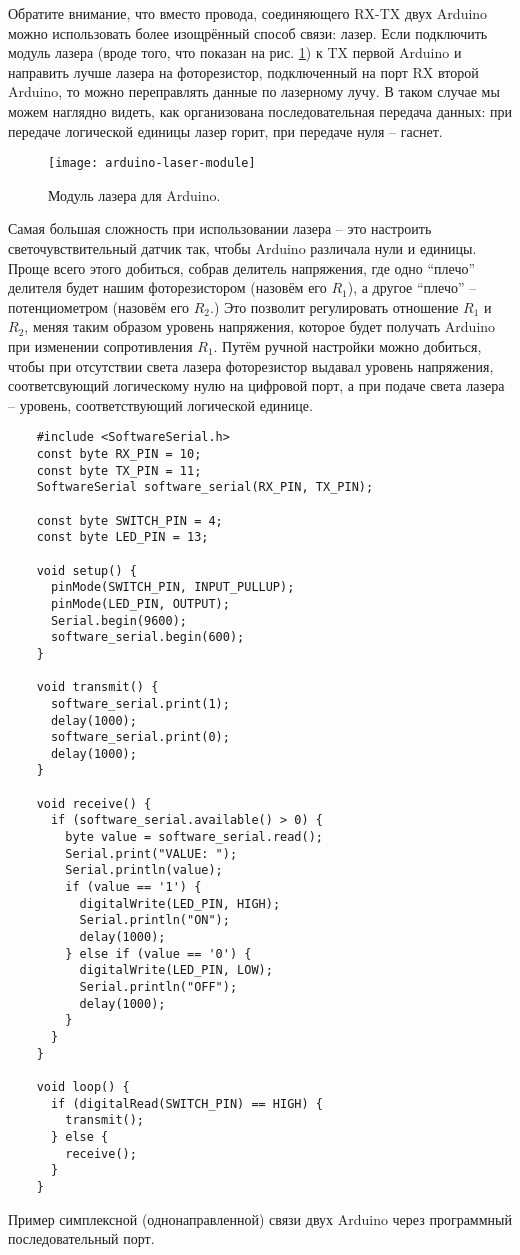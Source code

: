 \documentclass[../sparc.tex]{subfiles}
\begin{document}
Обратите внимание, что вместо провода, соединяющего RX-TX двух Arduino можно
использовать более изощрённый способ связи: лазер.  Если подключить модуль
лазера (вроде того, что показан на рис. \ref{fig:arduino-laser-module}) к TX
первой Arduino и направить лучше лазера на фоторезистор, подключенный на порт RX
второй Arduino, то можно переправлять данные по лазерному лучу.  В таком случае
мы можем наглядно видеть, как организована последовательная передача данных: при
передаче логической единицы лазер горит, при передаче нуля -- гаснет.

\begin{figure}[ht]
  \centering
  \texttt{[image: arduino-laser-module]}
  \caption{Модуль лазера для Arduino.}
  \label{fig:arduino-laser-module}
\end{figure}


Самая большая сложность при использовании лазера -- это настроить
светочувствительный датчик так, чтобы Arduino различала нули и единицы.  Проще
всего этого добиться, собрав делитель напряжения, где одно ``плечо'' делителя
будет нашим фоторезистором (назовём его $R_1$), а другое ``плечо'' --
потенциометром (назовём его $R_2$.)  Это позволит регулировать отношение $R_1$ и
$R_2$, меняя таким образом уровень напряжения, которое будет получать Arduino
при изменении сопротивления $R_1$.  Путём ручной настройки можно добиться, чтобы
при отсутствии света лазера фоторезистор выдавал уровень напряжения,
соответсвующий логическому нулю на цифровой порт, а при подаче света лазера --
уровень, соответствующий логической единице.

\begin{listing}[H]
  \begin{verbatim}
    #include <SoftwareSerial.h>
    const byte RX_PIN = 10;
    const byte TX_PIN = 11;
    SoftwareSerial software_serial(RX_PIN, TX_PIN);

    const byte SWITCH_PIN = 4;
    const byte LED_PIN = 13;

    void setup() {
      pinMode(SWITCH_PIN, INPUT_PULLUP);
      pinMode(LED_PIN, OUTPUT);
      Serial.begin(9600);
      software_serial.begin(600);
    }

    void transmit() {
      software_serial.print(1);
      delay(1000);
      software_serial.print(0);
      delay(1000);
    }

    void receive() {
      if (software_serial.available() > 0) {
        byte value = software_serial.read();
        Serial.print("VALUE: ");
        Serial.println(value);
        if (value == '1') {
          digitalWrite(LED_PIN, HIGH);
          Serial.println("ON");
          delay(1000);
        } else if (value == '0') {
          digitalWrite(LED_PIN, LOW);
          Serial.println("OFF");
          delay(1000);
        }
      }
    }

    void loop() {
      if (digitalRead(SWITCH_PIN) == HIGH) {
        transmit();
      } else {
        receive();
      }
    }
  \end{verbatim}
  \label{listing:communication-serial-two-arduino-example}
  \caption{Пример симплексной (однонаправленной) связи двух Arduino через
    программный последовательный порт.}
\end{listing}
\end{document}
